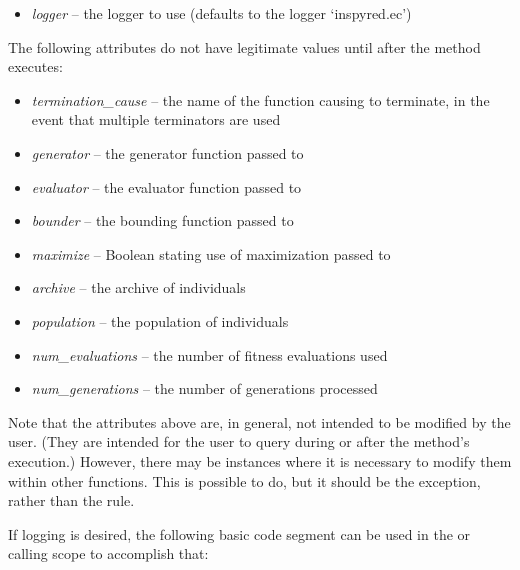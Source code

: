 \documentclass[letterpaper,10pt,english]{sphinxmanual}
\begin{document}
\begin{fulllineitems}
\begin{itemize}
\item {} 
\emph{logger} -- the logger to use (defaults to the logger `inspyred.ec')

\end{itemize}

The following attributes do not have legitimate values until after 
the  method executes:
\begin{itemize}
\item {} 
\emph{termination\_cause} -- the name of the function causing 
 to terminate, in the event that multiple terminators are used

\item {} 
\emph{generator} -- the generator function passed to 

\item {} 
\emph{evaluator} -- the evaluator function passed to 

\item {} 
\emph{bounder} -- the bounding function passed to 

\item {} 
\emph{maximize} -- Boolean stating use of maximization passed to 

\item {} 
\emph{archive} -- the archive of individuals

\item {} 
\emph{population} -- the population of individuals

\item {} 
\emph{num\_evaluations} -- the number of fitness evaluations used

\item {} 
\emph{num\_generations} -- the number of generations processed

\end{itemize}

Note that the attributes above are, in general, not intended to 
be modified by the user. (They are intended for the user to query
during or after the  method's execution.) However, 
there may be instances where it is necessary to modify them 
within other functions. This is possible to do, but it should be the 
exception, rather than the rule.

If logging is desired, the following basic code segment can be 
used in the  or calling scope to accomplish that:


\end{fulllineitems}
\end{document}
